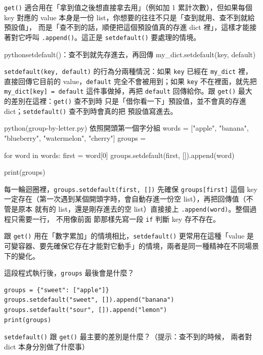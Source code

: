 \texttt{get()} 適合用在「拿到值之後想直接拿去用」（例如加 1 累計次數），但如果每個
key 對應的 value 本身是一份 list，你想要的往往不只是「查到就用、查不到就給預設值」，
而是「查不到的話，順便把這個預設值真的存進 dict 裡」，這樣才能接著對它呼叫
\texttt{.append()}。這正是 \texttt{setdefault()} 要處理的情境。

\begin{code}{python}{setdefault()：查不到就先存進去，再回傳}
my_dict.setdefault(key, default)
\end{code}

\texttt{setdefault(key, default)} 的行為分兩種情況：如果 \texttt{key} 已經在
\texttt{my\_dict} 裡，直接回傳它目前的 value，\texttt{default} 完全不會被用到；如果
\texttt{key} 不在裡面，就先把 \texttt{my\_dict[key] = default} 這件事做掉，再把
\texttt{default} 回傳給你。跟 \texttt{get()} 最大的差別在這裡：\texttt{get()} 查不到時
只是「借你看一下」預設值，並不會真的存進 dict；\texttt{setdefault()} 查不到時會真的把
預設值寫進去。

\begin{example}{python}{(group-by-letter.py) 依照開頭第一個字分組}
words = ["apple", "banana", "blueberry", "watermelon", "cherry"]
groups = {}

for word in words:
    first = word[0]
    groups.setdefault(first, []).append(word)

print(groups)
\end{example}


每一輪迴圈裡，\texttt{groups.setdefault(first, [])} 先確保 \texttt{groups[first]} 這個
key 一定存在（第一次遇到某個開頭字時，會自動存進一份空 list），再把回傳值（不管是原本
就有的 list，還是剛存進去的空 list）直接接上 \texttt{.append(word)}。整個過程只需要一行，
不用像前面  節那樣先寫一段 \texttt{if} 判斷 key 存不存在。

跟 \texttt{get()} 用在「數字累加」的情境相比，\texttt{setdefault()} 更常用在這種「value 是
可變容器、要先確保它存在才能對它動手」的情境，兩者是同一種精神在不同場景下的變化。

\begin{drills}[label=drills:dict-setdefault]
\item 這段程式執行後，\texttt{groups} 最後會是什麼？
\begin{verbatim}
groups = {"sweet": ["apple"]}
groups.setdefault("sweet", []).append("banana")
groups.setdefault("sour", []).append("lemon")
print(groups)
\end{verbatim}
\item \texttt{setdefault()} 跟 \texttt{get()} 最主要的差別是什麼？（提示：查不到的時候，
兩者對 dict 本身分別做了什麼事）
\end{drills}

